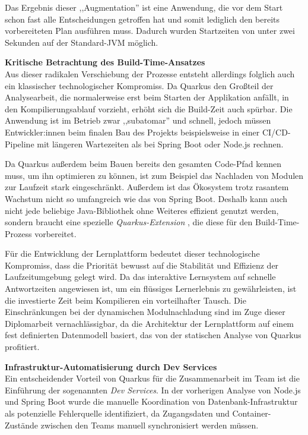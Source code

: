 Das Ergebnis dieser ,,Augmentation'' ist eine Anwendung, die vor dem Start schon fast alle Entscheidungen getroffen hat und somit lediglich den bereits vorbereiteten Plan ausführen muss. Dadurch wurden Startzeiten von unter zwei Sekunden auf der Standard-JVM möglich. \cite{QuarkusAugmentation}


\vspace{0.7cm}
\textbf{Kritische Betrachtung des Build-Time-Ansatzes} \\
Aus dieser radikalen Verschiebung der Prozesse entsteht allerdings folglich auch ein klassischer technologischer Kompromiss. Da Quarkus den Großteil der Analysearbeit, die normalerweise erst beim Starten der Applikation anfällt, in den Kompilierungsablauf vorzieht, erhöht sich die Build-Zeit auch spürbar. Die Anwendung ist im Betrieb zwar ,,subatomar'' und schnell, jedoch müssen Entwickler:innen beim finalen Bau des Projekts beispielsweise in einer CI/CD-Pipeline mit längeren Wartezeiten als bei Spring Boot oder Node.js rechnen.

Da Quarkus außerdem beim Bauen bereits den gesamten Code-Pfad kennen muss, um ihn optimieren zu können, ist zum Beispiel das Nachladen von Modulen zur Laufzeit stark eingeschränkt. Außerdem ist das Ökosystem trotz rasantem Wachstum nicht so umfangreich wie das von Spring Boot. Deshalb kann auch nicht jede beliebige Java-Bibliothek ohne Weiteres effizient genutzt werden, sondern braucht eine spezielle \textit{Quarkus-Extension} \cite{QuarkusExtensions}, die diese für den Build-Time-Prozess vorbereitet. \cite{ProsAndConsSpringVsQuarkus}

Für die Entwicklung der Lernplattform bedeutet dieser technologische Kompromiss, dass die Priorität bewusst auf die Stabilität und Effizienz der Laufzeitumgebung gelegt wird. Da das interaktive Lernsystem auf schnelle Antwortzeiten angewiesen ist, um ein flüssiges Lernerlebnis zu gewährleisten, ist die investierte Zeit beim Kompilieren ein vorteilhafter Tausch. Die Einschränkungen bei der dynamischen Modulnachladung sind im Zuge dieser Diplomarbeit vernachlässigbar, da die Architektur der Lernplattform auf einem fest definierten Datenmodell basiert, das von der statischen Analyse von Quarkus profitiert.


\vspace{0.7cm}
\textbf{Infrastruktur-Automatisierung durch Dev Services} \\
Ein entscheidender Vorteil von Quarkus für die Zusammenarbeit im Team ist die Einführung der sogenannten \textit{Dev Services}. In der vorherigen Analyse von Node.js und Spring Boot wurde die manuelle Koordination von Datenbank-Infrastruktur als potenzielle Fehlerquelle identifiziert, da Zugangsdaten und Container-Zustände zwischen den Teams manuell synchronisiert werden müssen.

